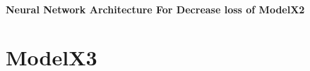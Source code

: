 \documentclass[twocolumn, a4j, 10pt, fleqn]{ltjsarticle}
\begin{document}
\subsection{Neural Network Architecture For Decrease loss of ModelX2}

\part{ModelX3}
\end{document}
